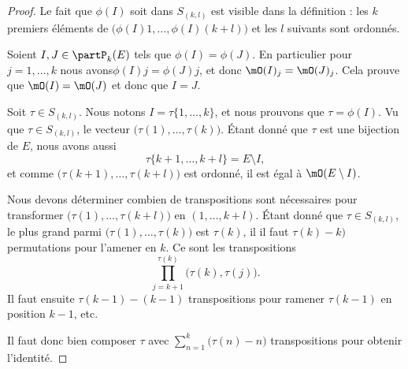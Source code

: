 \begin{proof}
	Le fait que \( \phi(I)\) soit dans \( S_{(k,l)}\) est visible dans la définition : les \( k\) premiers éléments de \( \big( \phi(I)1,\ldots,\phi(I)(k+l) \big)\) et les \( l\) suivants sont ordonnés.

	\begin{subproof}
		\spitem[Injective]
		Soient \( I,J\in\partP_k(E)\) tels que \( \phi(I)=\phi(J)\). En particulier pour \( j=1,\ldots,k\) nous avons\( \phi(I)j=\phi(J)j\), et donc \( \mO(I)_j=\mO(J)_j\). Cela prouve que \( \mO(I)=\mO(J)\) et donc que \( I=J\).

		\spitem[Surjective]
		Soit \( \tau\in S_{(k,l)}\). Nous notons \( I=\tau\{ 1,\ldots,k \}\), et nous prouvons que \( \tau=\phi(I)\). Vu que \( \tau\in S_{(k,l)}\), le vecteur \( \big( \tau(1),\ldots,\tau(k) \big)\). Étant donné que \( \tau\) est une bijection de \( E\), nous avons aussi
		\begin{equation}
			\tau\{ k+1,\ldots,k+l \}=E\setminus I,
		\end{equation}
		et comme \( \big( \tau(k+1),\ldots,\tau(k+l) \big)\) est ordonné, il est égal à \( \mO(E\setminus I)\).
	\end{subproof}
	Nous devons déterminer combien de transpositions sont nécessaires pour transformer \( \big( \tau(1),\ldots,\tau(k+l) \big) \) en \( (1,\ldots, k+l)\). Étant donné que \( \tau\in S_{(k,l)}\), le plus grand parmi \( \big( \tau(1),\ldots,\tau(k) \big)\) est \( \tau(k)\), il il faut \( \tau(k)-k)\) permutations pour l'amener en \( k\). Ce sont les transpositions
	\begin{equation}
		\prod_{j=k+1}^{\tau(k)}\big( \tau(k),\tau(j) \big).
	\end{equation}
	Il faut ensuite \( \tau(k-1)-(k-1)\) transpositions pour ramener \( \tau(k-1)\) en position \( k-1\), etc.

	Il faut donc bien composer \( \tau \) avec \( \sum_{n=1}^k\big( \tau(n)-n \big)\) transpositions pour obtenir l'identité.
\end{proof}

